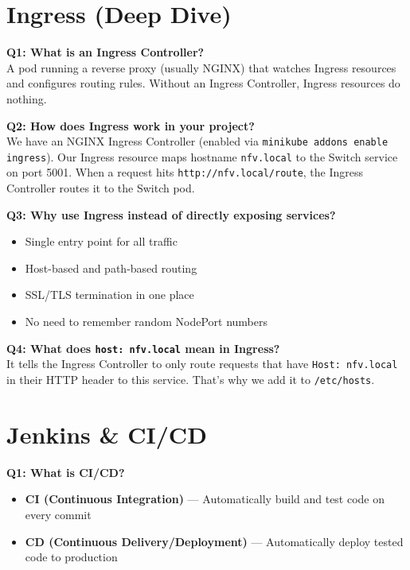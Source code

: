 \documentclass[12pt,a4paper]{article}
\begin{document}
\section{Ingress (Deep Dive)}

\textbf{Q1: What is an Ingress Controller?}\\
A pod running a reverse proxy (usually NGINX) that watches Ingress resources and configures routing rules. Without an Ingress Controller, Ingress resources do nothing.

\textbf{Q2: How does Ingress work in your project?}\\
We have an NGINX Ingress Controller (enabled via \texttt{minikube addons enable ingress}). Our Ingress resource maps hostname \texttt{nfv.local} to the Switch service on port 5001. When a request hits \texttt{http://nfv.local/route}, the Ingress Controller routes it to the Switch pod.

\textbf{Q3: Why use Ingress instead of directly exposing services?}
\begin{itemize}[noitemsep]
    \item Single entry point for all traffic
    \item Host-based and path-based routing
    \item SSL/TLS termination in one place
    \item No need to remember random NodePort numbers
\end{itemize}

\textbf{Q4: What does \texttt{host: nfv.local} mean in Ingress?}\\
It tells the Ingress Controller to only route requests that have \texttt{Host: nfv.local} in their HTTP header to this service. That's why we add it to \texttt{/etc/hosts}.

\section{Jenkins \& CI/CD}

\textbf{Q1: What is CI/CD?}
\begin{itemize}[noitemsep]
    \item \textbf{CI (Continuous Integration)} --- Automatically build and test code on every commit
    \item \textbf{CD (Continuous Delivery/Deployment)} --- Automatically deploy tested code to production
\end{itemize}
\end{document}
